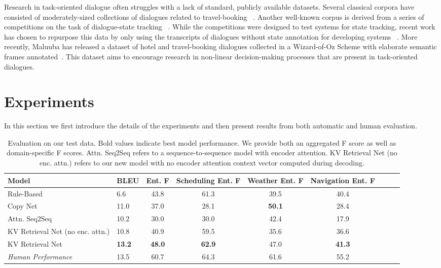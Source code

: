 \documentclass[11pt,a4paper]{article}
\begin{document}
  Research in task-oriented dialogue often struggles with a lack of standard, publicly available datasets. Several classical corpora have consisted of moderately-sized collections of dialogues related to travel-booking ~\cite{Hemphill:90,Bennett:02}. Another well-known corpus is derived from a series of competitions on the task of dialogue-state tracking ~\cite{Williams:13}. While the competitions were designed to test systems for state tracking, recent work has chosen to repurpose this data by only using the transcripts of dialogues without state annotation for developing systems ~\cite{Bordes:16,Williams:17}. More recently, Maluuba has released a dataset of hotel and travel-booking dialogues collected in a Wizard-of-Oz Scheme with elaborate semantic frames annotated~\cite{El-Asri:16}. This dataset aims to encourage research in non-linear decision-making processes that are present in task-oriented dialogues.


\section{Experiments}
In this section we first introduce the details of the experiments and then present results from both automatic and human evaluation.

\begin{table*}[ht]
\centering
\small
\begin{tabular}{@{}llccccccc@{}}
 {\bf Model} & {\bf BLEU} & {\bf Ent. F} & {\bf Scheduling Ent. F} & {\bf Weather Ent. F} & {\bf Navigation Ent. F} \\
\hline 
Rule-Based & 6.6 & 43.8  & 61.3 & 39.5 & 40.4\\
Copy Net &   11.0 & 37.0 & 28.1 & \textbf{50.1} & 28.4 \\
Attn. Seq2Seq & 10.2 & 30.0 & 30.0 & 42.4 & 17.9 \\
KV Retrieval Net (no enc. attn.) & 10.8 & 40.9 & 59.5 & 35.6 & 36.6 & \\
KV Retrieval Net & \textbf{13.2} & \textbf{48.0} & \textbf{62.9} & 47.0 & \textbf{41.3} \\
\hline
\emph{Human Performance} & 13.5 & 60.7 & 64.3 & 61.6 & 55.2 \\
\hline
\end{tabular}
\caption{Evaluation on our test data. Bold values indicate best model performance. We provide both an aggregated F score as well as domain-specific F scores. Attn. Seq2Seq refers to a sequence-to-sequence model with encoder attention. KV Retrieval Net (no enc. attn.) refers to our new model with no encoder attention context vector computed during decoding.}\label{tab:results}
\end{table*}
\end{document}
